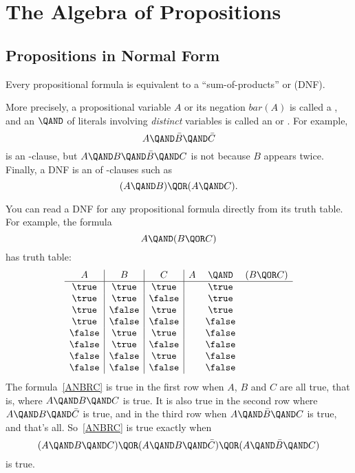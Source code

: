 \section{The Algebra of Propositions}\label{prop_algebra_sec}

\subsection{Propositions in Normal Form}\label{normal_form_sec}
Every propositional formula is equivalent to a ``sum-of-products'' or
 (DNF). 

More precisely, a propositional variable $A$ or its negation $bar(A)$
is called a , and an $\QAND$ of literals involving
\emph{distinct} variables is called an  or
.  For example,
\[
A \QAND \bar{B} \QAND \bar{C}
\]
is an \QAND-clause, but $A \QAND B \QAND \bar{B} \QAND C$ is not
because $B$ appears twice.  Finally, a DNF is an \QOR of \QAND-clauses such as
\begin{equation}\label{ANBOANC}
(A \QAND B) \QOR (A \QAND C).
\end{equation}

You can read a DNF for any propositional formula directly
from its truth table.  For example, the formula
\begin{equation}\label{ANBRC}
A \QAND (B \QOR C)
\end{equation}
has truth table:
\[\begin{array}{c|c|c|ccc}
A      & B      & C       & A & \QAND & (B \QOR C)\label{ANBRCTT}\\
\hline \true  & \true  & \true   &   &  \true\\
\true  & \true  & \false  &   &  \true\\
\true  & \false & \true   &   &  \true\\
\true  & \false & \false  &   &  \false\\
\false & \true  & \true   &   &  \false\\
\false & \true  & \false  &   &  \false\\
\false & \false & \true   &   &  \false\\
\false & \false & \false  &   &  \false
\end{array}\]
The formula~\eqref{ANBRC} is true in the first row when $A$, $B$ and
$C$ are all true, that is, where $A \QAND B \QAND C$ is true.  It is
also true in the second row where $A \QAND B \QAND \bar{C}$ is true,
and in the third row when $A \QAND \bar{B} \QAND C$ is true, and
that's all.  So~\eqref{ANBRC} is true exactly when
\begin{equation}\label{ABCDNF}
(A \QAND B \QAND C) \QOR (A \QAND B \QAND \bar{C}) \QOR
  (A \QAND \bar{B} \QAND C)
\end{equation}
is true.

